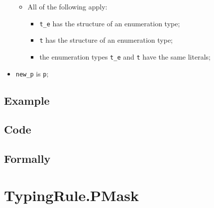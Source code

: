 \documentclass{book}
\begin{document}
\begin{itemize}
\begin{itemize}
\begin{itemize}
              \end{itemize}
            \item All of the following apply:
              \begin{itemize}
                \item \texttt{t\_e} has the structure of an enumeration type;
                \item \texttt{t} has the structure of an enumeration type;
                \item the enumeration types \texttt{t\_e} and \texttt{t} have the same literals;
              \end{itemize}
          \end{itemize}
        \item \texttt{new\_p} is \texttt{p};
      \end{itemize}

  \subsection{Example}

  \subsection{Code}

\begin{emptyformal}
    \subsection{Formally}
\end{emptyformal}


\section{TypingRule.PMask \label{sec:TypingRule.PMask}}
\end{document}
